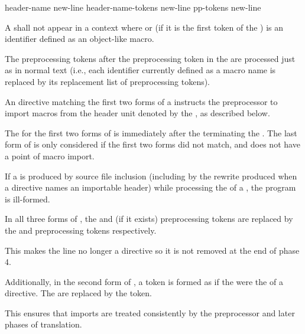 \begin{bnf}
\br
      header-name  \terminal{;} new-line\br
      header-name-tokens  \terminal{;} new-line\br
      pp-tokens \terminal{;} new-line
\end{bnf}

\pnum
A  shall not
appear in a context where 
or (if it is the first token of the ) 
is an identifier defined as an object-like macro.

\pnum
The preprocessing tokens after the  preprocessing token
in the  
are processed just as in normal text
(i.e., each identifier currently defined as a macro name
is replaced by its replacement list of preprocessing tokens).
\begin{note}
An  directive
matching the first two forms of a 
instructs the preprocessor to import macros
from the header unit
denoted by the ,
as described below.
\end{note}
%
The  for the
first two forms of  is
immediately after the  terminating
the .
The last form of  is only considered
if the first two forms did not match, and
does not have a point of macro import.

\pnum
If a  is produced by source file inclusion
(including by the rewrite produced
when a  directive names an importable header)
while processing the  of a ,
the program is ill-formed.

\pnum
In all three forms of ,
the  and  (if it exists) preprocessing tokens
are replaced by the  and
 preprocessing tokens respectively.
\begin{note}
This makes the line no longer a directive
so it is not removed at the end of phase 4.
\end{note}
Additionally, in the second form of ,
a  token is formed as if
the 
were the  of a  directive.
The  are replaced by
the  token.
\begin{note}
This ensures that imports are treated consistently by
the preprocessor and later phases of translation.
\end{note}

